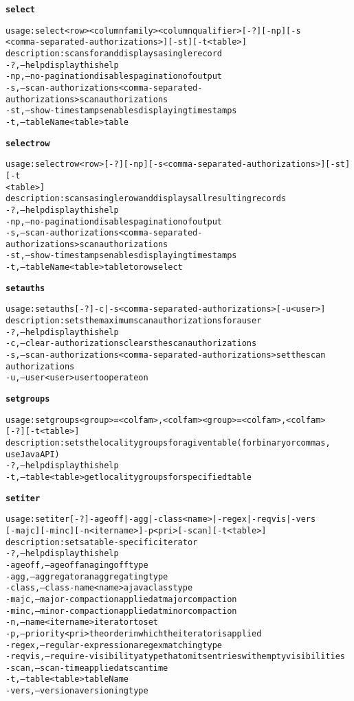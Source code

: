\begin{alltt}
\textbf{select}

    usage: select <row> <columnfamily> <columnqualifier> [-?] [-np] [-s
    	      <comma-separated-authorizations>] [-st] [-t <table>]
    description: scans for and displays a single record
      -?,--help  display this help
      -np,--no-pagination  disables pagination of output
      -s,--scan-authorizations <comma-separated-authorizations>  scan authorizations
      -st,--show-timestamps  enables displaying timestamps
      -t,--tableName <table>  table

\textbf{selectrow}

    usage: selectrow <row> [-?] [-np] [-s <comma-separated-authorizations>] [-st] [-t
    	      <table>]
    description: scans a single row and displays all resulting records
      -?,--help  display this help
      -np,--no-pagination  disables pagination of output
      -s,--scan-authorizations <comma-separated-authorizations>  scan authorizations
      -st,--show-timestamps  enables displaying timestamps
      -t,--tableName <table>  table to row select

\textbf{setauths}

    usage: setauths [-?] -c | -s <comma-separated-authorizations>  [-u <user>]
    description: sets the maximum scan authorizations for a user
      -?,--help  display this help
      -c,--clear-authorizations  clears the scan authorizations
      -s,--scan-authorizations <comma-separated-authorizations>  set the scan
    	      authorizations
      -u,--user <user>  user to operate on

\textbf{setgroups}

    usage: setgroups <group>=<col fam>{,<col fam>}{ <group>=<col fam>{,<col fam>}}
    	      [-?] [-t <table>]
    description: sets the locality groups for a given table (for binary or commas,
    	      use Java API)
      -?,--help  display this help
      -t,--table <table>  get locality groups for specified table

\textbf{setiter}

    usage: setiter [-?] -ageoff | -agg | -class <name> | -regex | -reqvis | -vers 
    	      [-majc] [-minc] [-n <itername>] -p <pri>	[-scan] [-t <table>]
    description: sets a table-specific iterator
      -?,--help  display this help
      -ageoff,--ageoff  an aging off type
      -agg,--aggregator  an aggregating type
      -class,--class-name <name>  a java class type
      -majc,--major-compaction  applied at major compaction
      -minc,--minor-compaction  applied at minor compaction
      -n,--name <itername>	iterator to set
      -p,--priority <pri>  the order in which the iterator is applied
      -regex,--regular-expression  a regex matching type
      -reqvis,--require-visibility	a type that omits entries with empty visibilities
      -scan,--scan-time  applied at scan time
      -t,--table <table>  tableName
      -vers,--version  a versioning type


\end{alltt}
